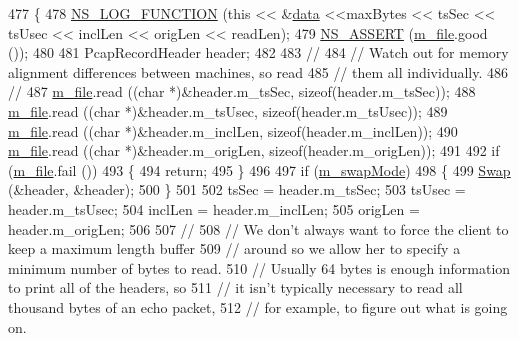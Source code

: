 \begin{DoxyCode}
477 \{
478   \hyperlink{log-macros-disabled_8h_a90b90d5bad1f39cb1b64923ea94c0761}{NS\_LOG\_FUNCTION} (\textcolor{keyword}{this} << &\hyperlink{topology-example-sim_8cc_a26c65296e316af77b787dc77469bb2a4}{data} <<maxBytes << tsSec << tsUsec << inclLen << origLen << 
      readLen);
479   \hyperlink{assert_8h_a6dccdb0de9b252f60088ce281c49d052}{NS\_ASSERT} (\hyperlink{classns3_1_1PcapFile_ac8ecc2d37ff1e2a5148901e10f855c26}{m\_file}.good ());
480 
481   PcapRecordHeader header;
482 
483   \textcolor{comment}{//}
484   \textcolor{comment}{// Watch out for memory alignment differences between machines, so read}
485   \textcolor{comment}{// them all individually.}
486   \textcolor{comment}{//}
487   \hyperlink{classns3_1_1PcapFile_ac8ecc2d37ff1e2a5148901e10f855c26}{m\_file}.read ((\textcolor{keywordtype}{char} *)&header.m\_tsSec, \textcolor{keyword}{sizeof}(header.m\_tsSec));
488   \hyperlink{classns3_1_1PcapFile_ac8ecc2d37ff1e2a5148901e10f855c26}{m\_file}.read ((\textcolor{keywordtype}{char} *)&header.m\_tsUsec, \textcolor{keyword}{sizeof}(header.m\_tsUsec));
489   \hyperlink{classns3_1_1PcapFile_ac8ecc2d37ff1e2a5148901e10f855c26}{m\_file}.read ((\textcolor{keywordtype}{char} *)&header.m\_inclLen, \textcolor{keyword}{sizeof}(header.m\_inclLen));
490   \hyperlink{classns3_1_1PcapFile_ac8ecc2d37ff1e2a5148901e10f855c26}{m\_file}.read ((\textcolor{keywordtype}{char} *)&header.m\_origLen, \textcolor{keyword}{sizeof}(header.m\_origLen));
491 
492   \textcolor{keywordflow}{if} (\hyperlink{classns3_1_1PcapFile_ac8ecc2d37ff1e2a5148901e10f855c26}{m\_file}.fail ())
493     \{
494       \textcolor{keywordflow}{return};
495     \}
496 
497   \textcolor{keywordflow}{if} (\hyperlink{classns3_1_1PcapFile_a179acfdfb216038a20ddb8cdc5fe182d}{m\_swapMode})
498     \{
499       \hyperlink{classns3_1_1PcapFile_af5adf22a721473f1add1e002492f5587}{Swap} (&header, &header);
500     \}
501 
502   tsSec = header.m\_tsSec;
503   tsUsec = header.m\_tsUsec;
504   inclLen = header.m\_inclLen;
505   origLen = header.m\_origLen;
506 
507   \textcolor{comment}{//}
508   \textcolor{comment}{// We don't always want to force the client to keep a maximum length buffer }
509   \textcolor{comment}{// around so we allow her to specify a minimum number of bytes to read.}
510   \textcolor{comment}{// Usually 64 bytes is enough information to print all of the headers, so}
511   \textcolor{comment}{// it isn't typically necessary to read all thousand bytes of an echo packet,}
512   \textcolor{comment}{// for example, to figure out what is going on.}

\end{DoxyCode}
